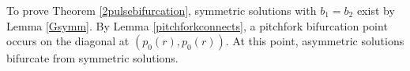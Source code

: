 \documentclass[thesis.tex]{subfiles}
\begin{document}
To prove Theorem \ref{2pulsebifurcation}, symmetric solutions with $b_1 = b_2$ exist by Lemma \ref{Gsymm}. By Lemma \ref{pitchforkconnects}, a pitchfork bifurcation point occurs on the diagonal at $(p_0(r), p_0(r))$. At this point, asymmetric solutions bifurcate from symmetric solutions.

\iffulldocument\else
	
	
\fi
\end{document}
